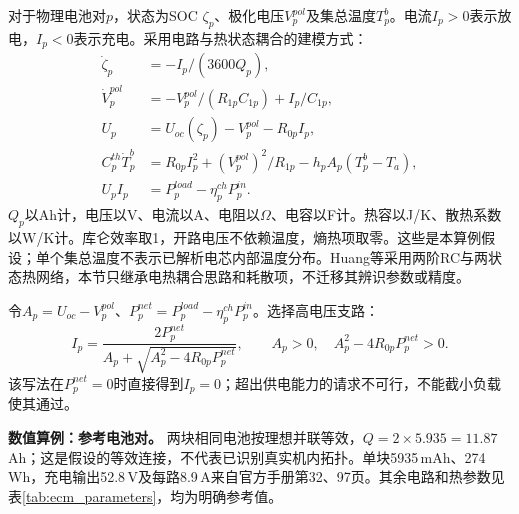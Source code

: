 对于物理电池对$p$，状态为SOC $\zeta_p$、极化电压$V_p^{pol}$及集总温度$T_p^b$。电流$I_p>0$表示放电，$I_p<0$表示充电。采用电路与热状态耦合的建模方式\cite{HuangBattery2021,PyBaMMThevenin}：
\begin{align}
 \dot\zeta_p&=-I_p/(3600Q_p),\\
 \dot V_p^{pol}&=-V_p^{pol}/(R_{1p}C_{1p})+I_p/C_{1p},\\
 U_p&=U_{oc}(\zeta_p)-V_p^{pol}-R_{0p}I_p,\\
 C_p^{th}\dot T_p^b&=R_{0p}I_p^2+(V_p^{pol})^2/R_{1p}-h_pA_p(T_p^b-T_a),\\
 U_pI_p&=P_p^{load}-\eta_p^{ch}P_p^{in}.
 \label{s0408:ecm_system}
\end{align}
$Q_p$以Ah计，电压以V、电流以A、电阻以$\Omega$、电容以F计。热容以J/K、散热系数以W/K计。库仑效率取1，开路电压不依赖温度，熵热项取零。这些是本算例假设；单个集总温度不表示已解析电芯内部温度分布。Huang等采用两阶RC与两状态热网络，本节只继承电热耦合思路和耗散项，不迁移其辨识参数或精度。

令$A_p=U_{oc}-V_p^{pol}$、$P_p^{net}=P_p^{load}-\eta_p^{ch}P_p^{in}$。选择高电压支路：
\begin{equation}
 I_p=\frac{2P_p^{net}}{A_p+\sqrt{A_p^2-4R_{0p}P_p^{net}}},\qquad
 A_p>0,\quad A_p^2-4R_{0p}P_p^{net}>0.
 \label{s0408:power_branch}
\end{equation}
该写法在$P_p^{net}=0$时直接得到$I_p=0$；超出供电能力的请求不可行，不能截小负载使其通过。

\textbf{数值算例：参考电池对。} 两块相同电池按理想并联等效，$Q=2\times5.935=11.87$\,Ah；这是假设的等效连接，不代表已识别真实机内拓扑。单块5935\,mAh、274\,Wh，充电输出52.8\,V及每路8.9\,A来自官方手册第32、97页\cite{DJIM300Manual}。其余电路和热参数见表\ref{tab:ecm_parameters}，均为明确参考值。

